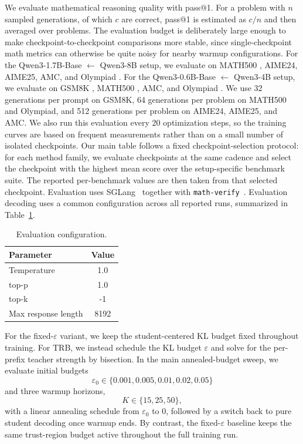 \documentclass[11pt]{article}
\begin{document}
We evaluate mathematical reasoning quality with pass@1.
For a problem with $n$ sampled generations, of which $c$ are correct, pass@1 is estimated as $c/n$ and then averaged over problems.
The evaluation budget is deliberately large enough to make checkpoint-to-checkpoint comparisons more stable, since single-checkpoint math metrics can otherwise be quite noisy for nearby warmup configurations.
For the Qwen3-1.7B-Base $\leftarrow$ Qwen3-8B setup, we evaluate on MATH500 \citep{hendrycks2021math}, AIME24, AIME25, AMC, and Olympiad \citep{he2024olympiadbench}.
For the Qwen3-0.6B-Base $\leftarrow$ Qwen3-4B setup, we evaluate on GSM8K \citep{cobbe2021training}, MATH500 \citep{hendrycks2021math}, AMC, and Olympiad \citep{he2024olympiadbench}.
We use 32 generations per prompt on GSM8K, 64 generations per problem on MATH500 and Olympiad, and 512 generations per problem on AIME24, AIME25, and AMC.
We also run this evaluation every 20 optimization steps, so the training curves are based on frequent measurements rather than on a small number of isolated checkpoints.
Our main table follows a fixed checkpoint-selection protocol: for each method family, we evaluate checkpoints at the same cadence and select the checkpoint with the highest mean score over the setup-specific benchmark suite.
The reported per-benchmark values are then taken from that selected checkpoint.
Evaluation uses SGLang~\citep{sglang} together with \texttt{math-verify}~\citep{mathverify}.
Evaluation decoding uses a common configuration across all reported runs, summarized in Table~\ref{tab:eval-config}.

\begin{table}[h]
\centering
\small
\begin{tabular}{lc}
\toprule
\textbf{Parameter} & \textbf{Value} \\
\midrule
Temperature & 1.0 \\
top-p & 1.0 \\
top-k & -1 \\
Max response length & 8192 \\
\bottomrule
\end{tabular}
\caption{Evaluation configuration.}
\label{tab:eval-config}
\end{table}

For the fixed-$\varepsilon$ variant, we keep the student-centered KL budget fixed throughout training.
For TRB, we instead schedule the KL budget $\varepsilon$ and solve for the per-prefix teacher strength by bisection.
In the main annealed-budget sweep, we evaluate initial budgets
\[
\varepsilon_0 \in \{0.001, 0.005, 0.01, 0.02, 0.05\}
\]
and three warmup horizons,
\[
K \in \{15, 25, 50\},
\]
with a linear annealing schedule from $\varepsilon_0$ to $0$, followed by a switch back to pure student decoding once warmup ends.
By contrast, the fixed-$\varepsilon$ baseline keeps the same trust-region budget active throughout the full training run.
\end{document}

